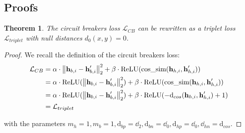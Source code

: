 \documentclass[11pt]{article}
\begin{document}
\subsection{Proofs}
\label{sec:appendix_proofs}

\newtheorem{theorem}{Theorem}
\newtheorem{lemma}{Lemma}

\begin{theorem}
  The circuit breakers loss $\mathcal{L}_{CB}$ can be rewritten as a triplet loss $\mathcal{L}_{triplet}$ with null distances $d_0(x, y) = 0$.
\end{theorem}
\begin{proof}
We recall the definition of the circuit breakers loss:
\begin{align}
  \mathcal{L}_{CB} &= \alpha \cdot \left\lVert \textbf{h}_{b,i} - \textbf{h}^\prime_{b,i} \right\rVert_2^2 + \beta \cdot \text{ReLU}(\text{cos\_sim}(\textbf{h}_{h,i}, \textbf{h}^\prime_{h,i})) \\
                   &= \alpha \cdot \text{ReLU}(\left\lVert \textbf{h}_{b,i} - \textbf{h}^\prime_{b,i} \right\rVert_2^2) + \beta \cdot \text{ReLU}(\text{cos\_sim}(\textbf{h}_{h,i}, \textbf{h}^\prime_{h,i})) \\
                   &= \alpha \cdot \text{ReLU}(\left\lVert \textbf{h}_{b,i} - \textbf{h}^\prime_{b,i} \right\rVert_2^2) + \beta \cdot \text{ReLU}(- \text{d}_{cos}(\textbf{h}_{h,i}, \textbf{h}^\prime_{h,i}) + 1) \\
                   &= \mathcal{L}_{triplet}
\end{align}

with the parameters $m_h = 1, m_b = 1, \text{d}_{bp} = \dd_2, \text{d}_{bn} = \dd_0, \text{d}_{hp} = \dd_0, \dd_{hn} = \text{d}_{cos}$.

\end{proof}

\newcommand{\ba}{\mathbf{a}}
\end{document}
